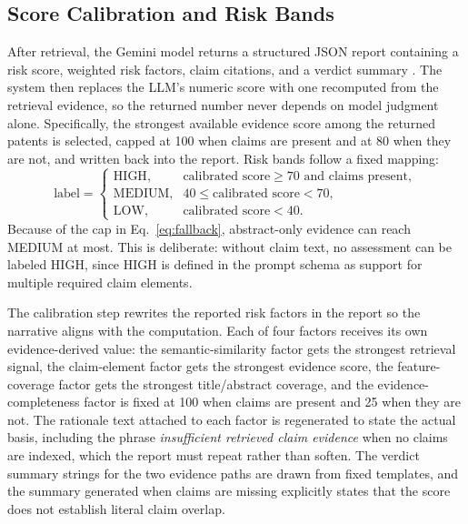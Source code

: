 \documentclass[journal]{IEEEtran}
\begin{document}
\subsection{Score Calibration and Risk Bands}
After retrieval, the Gemini model returns a structured JSON report containing a risk score, weighted risk factors, claim citations, and a verdict summary \cite{google2025gemini}. The system then replaces the LLM's numeric score with one recomputed from the retrieval evidence, so the returned number never depends on model judgment alone. Specifically, the strongest available evidence score among the returned patents is selected, capped at 100 when claims are present and at 80 when they are not, and written back into the report. Risk bands follow a fixed mapping:
\begin{equation}
\text{label} =
\begin{cases}
\text{HIGH}, & \text{calibrated score} \ge 70 \text{ and claims present},\\
\text{MEDIUM}, & 40 \le \text{calibrated score} < 70,\\
\text{LOW}, & \text{calibrated score} < 40 .
\end{cases}
\label{eq:bands}
\end{equation}
Because of the cap in Eq.~\eqref{eq:fallback}, abstract-only evidence can reach MEDIUM at most. This is deliberate: without claim text, no assessment can be labeled HIGH, since HIGH is defined in the prompt schema as support for multiple required claim elements.

The calibration step rewrites the reported risk factors in the report so the narrative aligns with the computation. Each of four factors receives its own evidence-derived value: the semantic-similarity factor gets the strongest retrieval signal, the claim-element factor gets the strongest evidence score, the feature-coverage factor gets the strongest title/abstract coverage, and the evidence-completeness factor is fixed at 100 when claims are present and 25 when they are not. The rationale text attached to each factor is regenerated to state the actual basis, including the phrase \emph{insufficient retrieved claim evidence} when no claims are indexed, which the report must repeat rather than soften. The verdict summary strings for the two evidence paths are drawn from fixed templates, and the summary generated when claims are missing explicitly states that the score does not establish literal claim overlap.
\end{document}

